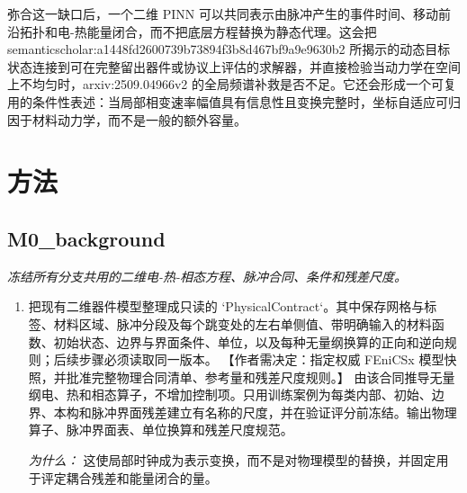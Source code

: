 \documentclass[10pt,a4paper]{article}
\begin{document}
弥合这一缺口后，一个二维 PINN 可以共同表示由脉冲产生的事件时间、移动前沿拓扑和电-热能量闭合，而不把底层方程替换为静态代理。这会把 semanticscholar:a1448fd2600739b73894f3b8d467bf9a9e9630b2 所揭示的动态目标状态连接到可在完整留出器件或协议上评估的求解器，并直接检验当动力学在空间上不均匀时，arxiv:2509.04966v2 的全局频谱补救是否不足。它还会形成一个可复用的条件性表述：当局部相变速率幅值具有信息性且变换完整时，坐标自适应可归因于材料动力学，而不是一般的额外容量。
\section*{方法}
\subsection*{M0\_background}
\emph{冻结所有分支共用的二维电-热-相态方程、脉冲合同、条件和残差尺度。}
\begin{enumerate}[leftmargin=*,start=1]
  \item 把现有二维器件模型整理成只读的 `PhysicalContract`。其中保存网格与标签、材料区域、脉冲分段及每个跳变处的左右单侧值、带明确输入的材料函数、初始状态、边界与界面条件、单位，以及每种无量纲换算的正向和逆向规则；后续步骤必须读取同一版本。 【作者需决定：指定权威 FEniCSx 模型快照，并批准完整物理合同清单、参考量和残差尺度规则。】 由该合同推导无量纲电、热和相态算子，不增加控制项。只用训练案例为每类内部、初始、边界、本构和脉冲界面残差建立有名称的尺度，并在验证评分前冻结。输出物理算子、脉冲界面表、单位换算和残差尺度规范。
\par\emph{为什么：} 这使局部时钟成为表示变换，而不是对物理模型的替换，并固定用于评定耦合残差和能量闭合的量。
\end{enumerate}
\end{document}
